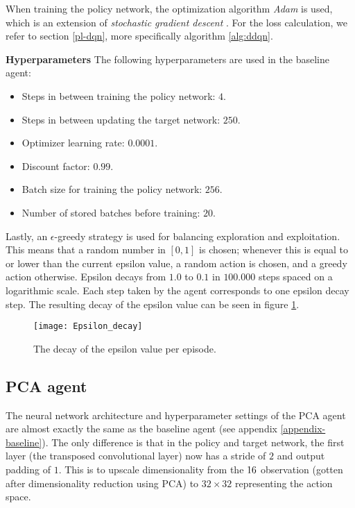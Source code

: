 When training the policy network, the optimization algorithm \emph{Adam} is used, which is an extension of \emph{stochastic gradient descent} \cite{adam}. For the loss calculation, we refer to section \ref{pl-dqn}, more specifically algorithm \ref{alg:ddqn}.\newline

\noindent\textbf{Hyperparameters}\newline
\noindent The following hyperparameters are used in the baseline agent:
\begin{itemize}
\item Steps in between training the policy network: $4$.
\item Steps in between updating the target network: $250$.
\item Optimizer learning rate: $0.0001$.
\item Discount factor: $0.99$.
\item Batch size for training the policy network: $256$.
\item Number of stored batches before training: $20$.
\end{itemize}

Lastly, an $\epsilon$-greedy strategy is used for balancing exploration and exploitation. This means that a random number in $[0,1]$ is chosen; whenever this is equal to or lower than the current epsilon value, a random action is chosen, and a greedy action otherwise. Epsilon decays from $1.0$ to $0.1$ in $100.000$ steps spaced on a logarithmic scale. Each step taken by the agent corresponds to one epsilon decay step. The resulting decay of the epsilon value can be seen in figure \ref{fig:epsilon}.

\begin{figure}[h]
    \centering
    \texttt{[image: Epsilon\_decay]}
    \caption{The decay of the epsilon value per episode.}
    \label{fig:epsilon}
\end{figure}

\subsection{PCA agent}
The neural network architecture and hyperparameter settings of the PCA agent are almost exactly the same as the baseline agent (see appendix \ref{appendix-baseline}). The only difference is that in the policy and target network, the first layer (the transposed convolutional layer) now has a stride of $2$ and output padding of $1$. This is to upscale dimensionality from the $16 \time 16$ observation (gotten after dimensionality reduction using PCA) to $32 \times 32$ representing the action space.


